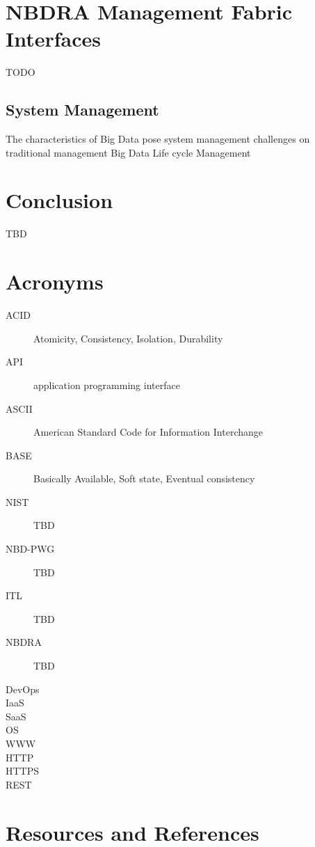 \documentclass[11pt]{article}
\begin{document}
\section{NBDRA Management Fabric Interfaces}
TODO

\subsection{System Management}

The characteristics of Big Data pose system management challenges on traditional management Big Data 
Life cycle Management

\section{Conclusion }
TBD

\appendix

\section{Acronyms}

\begin{description}
\item[ACID] 	Atomicity, Consistency, Isolation, Durability
\item[API] 	application programming interface 
\item[ASCII] 	American Standard Code for Information Interchange
\item[BASE] 	Basically Available, Soft state, Eventual consistency
\item[NIST] TBD
\item[NBD-PWG] TBD
\item[ITL] TBD
\item[NBDRA] TBD
\item[DevOps]
\item[IaaS]
\item[SaaS]
\item[OS]
\item[WWW]
\item[HTTP]
\item[HTTPS]
\item[REST]

\end{description}

\section{Resources and References}
\end{document}
